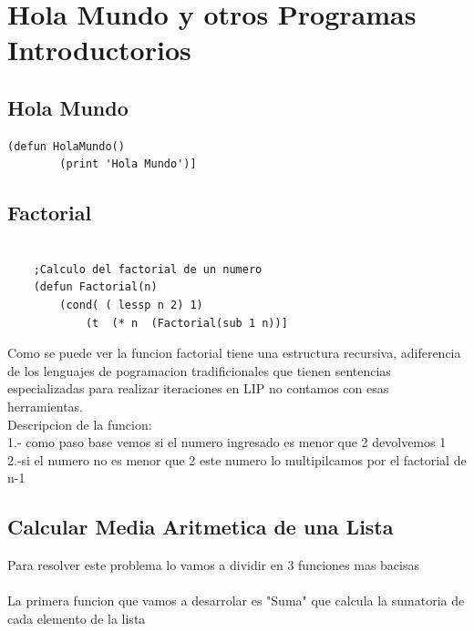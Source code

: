 \documentclass[11pt]{article} %
\begin{document}
\section{Hola Mundo y otros Programas Introductorios}


\subsection{Hola Mundo}
\lstset{language=LISP}          

\begin{lstlisting}[frame=single] 
	(defun HolaMundo()
		(print 'Hola Mundo')]

\end{lstlisting}

\subsection{Factorial}

\lstset{language=LISP}          %

\begin{lstlisting}[frame=single]
	
	;Calculo del factorial de un numero
	(defun Factorial(n)
		(cond( ( lessp n 2) 1)
			(t  (* n  (Factorial(sub 1 n))] 
\end{lstlisting}

Como se puede ver la funcion factorial tiene una estructura recursiva, adiferencia de los lenguajes de pogramacion tradificionales que tienen sentencias especializadas para realizar iteraciones en LIP no contamos con esas herramientas.\\
Descripcion de la funcion:\\
1.- como paso base vemos si el numero ingresado es menor que 2 devolvemos 1\\
2.-si el numero no es menor que 2 este numero lo multipilcamos por el factorial de n-1 \\

\subsection{Calcular Media Aritmetica de una Lista}

Para resolver este problema lo vamos a dividir en 3 funciones mas bacisas
\\  \\
La primera funcion que vamos a desarrolar es "Suma" que calcula la sumatoria de cada elemento de la lista
\lstset{language=LISP}          %
\end{document}
